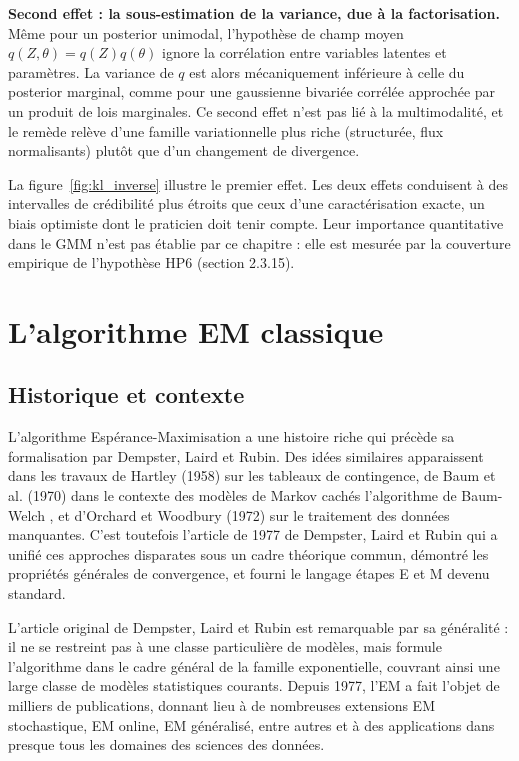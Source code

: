 \textbf{Second effet : la sous-estimation de la variance, due à la factorisation. }Même pour un posterior unimodal, l'hypothèse de champ moyen $q(Z, \theta) = q(Z)q(\theta)$ ignore la corrélation entre variables latentes et paramètres. La variance de $q$ est alors mécaniquement inférieure à celle du posterior marginal, comme pour une gaussienne bivariée corrélée approchée par un produit de lois marginales. Ce second effet n'est pas lié à la multimodalité, et le remède relève d'une famille variationnelle plus riche (structurée, flux normalisants) plutôt que d'un changement de divergence.

La figure~\ref{fig:kl_inverse} illustre le premier effet. Les deux effets conduisent à des intervalles de crédibilité plus étroits que ceux d'une caractérisation exacte, un biais optimiste dont le praticien doit tenir compte. Leur importance quantitative dans le GMM n'est pas établie par ce chapitre : elle est mesurée par la couverture empirique de l'hypothèse HP6 (section 2.3.15).



\section{L'algorithme EM classique}
\subsection{Historique et contexte}
L'algorithme Espérance-Maximisation a une histoire riche qui précède sa formalisation par Dempster, Laird et Rubin. Des idées similaires apparaissent dans les travaux de Hartley (1958) sur les tableaux de contingence, de Baum et al. (1970) dans le contexte des modèles de Markov cachés  l'algorithme de Baum-Welch , et d'Orchard et Woodbury (1972) sur le traitement des données manquantes. C'est toutefois l'article de 1977 de Dempster, Laird et Rubin qui a unifié ces approches disparates sous un cadre théorique commun, démontré les propriétés générales de convergence, et fourni le langage  étapes E et M  devenu standard.

L'article original de Dempster, Laird et Rubin est remarquable par sa généralité : il ne se restreint pas à une classe particulière de modèles, mais formule l'algorithme dans le cadre général de la famille exponentielle, couvrant ainsi une large classe de modèles statistiques courants. Depuis 1977, l'EM a fait l'objet de milliers de publications, donnant lieu à de nombreuses extensions  EM stochastique, EM online, EM généralisé, entre autres  et à des applications dans presque tous les domaines des sciences des données.

